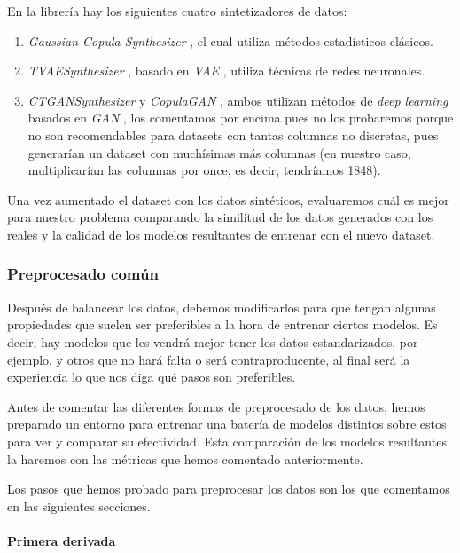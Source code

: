 En la librería hay los siguientes cuatro sintetizadores de datos:

\begin{enumerate}
    \item \textit{Gaussian Copula Synthesizer} \cite{Gaussian4:online}, el cual utiliza métodos estadísticos clásicos.
    \item \textit{TVAESynthesizer} \cite{TVAESynt0:online}, basado en \textit{VAE} \cite{Variatio61:online}, utiliza técnicas de redes neuronales.
    \item \textit{CTGANSynthesizer} \cite{CTGANSyn50:online} y \textit{CopulaGAN} \cite{CopulaGA37:online}, ambos utilizan métodos de \textit{deep learning} basados en \textit{GAN} \cite{Generati72:online}, los comentamos por encima pues no los probaremos porque no son recomendables para datasets con tantas columnas no discretas, pues generarían un dataset con muchísimas más columnas (en nuestro caso, multiplicarían las columnas por once, es decir, tendríamos 1848). 
\end{enumerate}

Una vez aumentado el dataset con los datos sintéticos, evaluaremos cuál es mejor para nuestro problema comparando la similitud de los datos generados con los reales y la calidad de los modelos resultantes de entrenar con el nuevo dataset.


\subsubsection{Preprocesado común}

Después de balancear los datos, debemos modificarlos para que tengan algunas propiedades que suelen ser preferibles a la hora de entrenar ciertos modelos. Es decir, hay modelos que les vendrá mejor tener los datos estandarizados, por ejemplo, y otros que no hará falta o será contraproducente, al final será la experiencia lo que nos diga qué pasos son preferibles.

Antes de comentar las diferentes formas de preprocesado de los datos, hemos preparado un entorno para entrenar una batería de modelos distintos sobre estos para ver y comparar su efectividad. Esta comparación de los modelos resultantes la haremos con las métricas que hemos comentado anteriormente.


Los pasos que hemos probado para preprocesar los datos son los que comentamos en las siguientes secciones.

\paragraph{Primera derivada}

